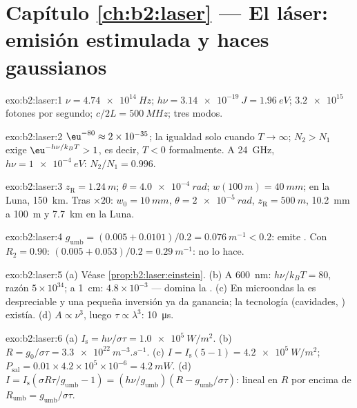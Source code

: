 \section*{Capítulo \ref{ch:b2:laser} --- El láser: emisión estimulada y haces gaussianos}

\begin{solution}{exo:b2:laser:1}
$\nu = \qty{4.74e14}{Hz}$; $h\nu = \qty{3.14e-19}{J} = \qty{1.96}{eV}$;
$\qty{3.2e15}{}$ fotones por segundo; $c/2L = \qty{500}{MHz}$; tres
modos.
\end{solution}

\begin{solution}{exo:b2:laser:2}
$\eu^{-80} \approx 2 \times 10^{-35}$; la igualdad solo cuando $T \to \infty$;
$N_2 > N_1$ exige $\eu^{-h\nu/k_BT} > 1$, es decir, $T < 0$ formalmente. A
\qty{24}{GHz}, $h\nu = \qty{1e-4}{eV}$: $N_2/N_1 = 0.996$.
\end{solution}

\begin{solution}{exo:b2:laser:3}
$z_{\text{R}} = \qty{1.24}{m}$; $\theta = \qty{4.0e-4}{rad}$; $w(\qty{100}{m}) =
\qty{40}{mm}$; en la Luna, \qty{150}{km}. Tras $\times 20$: $w_0 = \qty{10}{mm}$,
$\theta = \qty{2e-5}{rad}$, $z_{\text{R}} = \qty{500}{m}$, \qty{10.2}{mm} a
\qty{100}{m} y \qty{7.7}{km} en la Luna.
\end{solution}

\begin{solution}{exo:b2:laser:4}
$g_{\text{umb}} = (0.005 + 0.0101)/0.2 = \qty{0.076}{m^{-1}} < 0.2$: emite
. Con $R_2 = 0.90$: $(0.005 + 0.053)/0.2 = \qty{0.29}{m^{-1}}$: no
lo hace.
\end{solution}

\begin{solution}{exo:b2:laser:5}
(a) Véase \cref{prop:b2:laser:einstein}. (b) A \qty{600}{nm}: $h\nu/k_BT
= 80$, razón $5 \times 10^{34}$; a \qty{1}{cm}: $4.8 \times 10^{-3}$ ---
domina la . (c) En microondas
la  es despreciable y una pequeña inversión ya da
ganancia; la tecnología (cavidades, ) existía. (d) $A \propto
\nu^3$, luego $\tau \propto \lambda^3$: \qty{10}{\micro s}.
\end{solution}

\begin{solution}{exo:b2:laser:6}
(a) $I_{\text{s}} = h\nu/\sigma\tau = \qty{1.0e5}{W/m^2}$. (b) $R =
g_0/\sigma\tau = \qty{3.3e22}{m^{-3}.s^{-1}}$. (c) $I = I_{\text{s}}(5 - 1) =
\qty{4.2e5}{W/m^2}$; $P_{\text{sal}} = 0.01 \times 4.2 \times 10^5 \times
10^{-6} = \qty{4.2}{mW}$. (d) $I = I_{\text{s}}(\sigma R\tau/g_{\text{umb}}
- 1) = (h\nu/g_{\text{umb}})(R - g_{\text{umb}}/\sigma\tau)$: lineal en $R$
por encima de $R_{\text{umb}} = g_{\text{umb}}/\sigma\tau$.
\end{solution}

